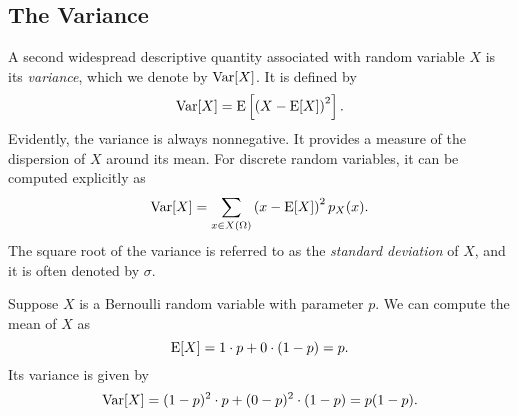 \subsection{The Variance}

A second widespread descriptive quantity associated with random variable $X$ is its \emph{variance}, which we denote by $\mathrm{Var} [X]$. 
It is defined by
\begin{equation} \label{equation:VarianceExplicit}
\mathrm{Var} [X] = \mathrm{E} \left[ \left( X - \mathrm{E} [X] \right)^2 \right] .
\end{equation}
Evidently, the variance is always nonnegative.
It provides a measure of the dispersion of $X$ around its mean.
For discrete random variables, it can be computed explicitly as
\begin{equation*}
\mathrm{Var} [X] = \sum_{x \in X(\Omega)} \left( x - \mathrm{E} [X] \right)^2 p_X (x) .
\end{equation*}
The square root of the variance is referred to as the \emph{standard deviation} of $X$, and it is often denoted by $\sigma$. 

\begin{example}
Suppose $X$ is a Bernoulli random variable with parameter $p$.
We can compute the mean of $X$ as
\begin{equation*}
\mathrm{E} [X] = 1 \cdot p + 0 \cdot (1 - p) = p .
\end{equation*}
Its variance is given by
\begin{equation*}
\mathrm{Var} [X] = (1 - p)^2 \cdot p + (0 - p)^2 \cdot (1 - p)
= p (1 - p) .
\end{equation*}
\end{example}

